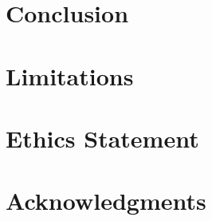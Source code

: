 \documentclass[11pt]{article}
\begin{document}
\section{Conclusion}
\label{sec:conclusion}


\section*{Limitations}


\section*{Ethics Statement}


\section*{Acknowledgments}




\end{document}
